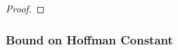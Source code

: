 \documentclass{article}
\theoremstyle{case}
\numberwithin{theorem}{subsection}
\DeclareMathOperator*{\argmin}{arg\,min}
\newcommand{\Rn}{\mathbb R^n}
\begin{document}
\begin{proof}
% 




% 
% 
% 
% 

\end{proof}


\subsubsection{Bound on Hoffman Constant}
\end{document}
